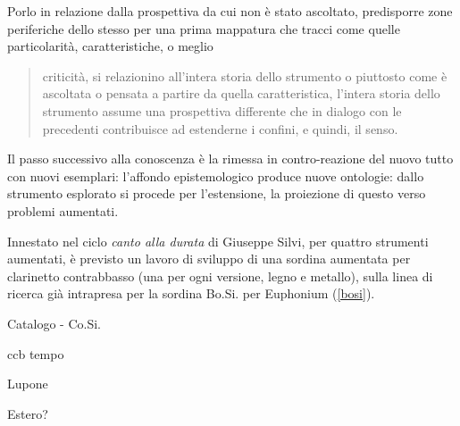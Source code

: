 \documentclass{gs-adonis}
\begin{document}
Porlo in relazione dalla prospettiva da cui non è stato ascoltato, predisporre 
zone periferiche dello stesso per una prima mappatura che tracci come 
quelle particolarità, caratteristiche, o meglio

\begin{quote}
  criticità, si relazionino all'intera storia dello strumento o piuttosto
  come è ascoltata o pensata a partire da quella caratteristica, l'intera
  storia dello strumento assume una prospettiva differente che in dialogo con
  le precedenti contribuisce ad estenderne i confini, e quindi, il senso.
\end{quote}


Il passo successivo alla conoscenza è la rimessa in contro-reazione del nuovo
tutto con nuovi esemplari: l'affondo epistemologico produce nuove ontologie:
dallo strumento esplorato si procede per l'estensione, la proiezione di questo
verso problemi aumentati.

Innestato nel ciclo \emph{canto alla durata} di Giuseppe Silvi, per quattro
strumenti aumentati, è previsto un lavoro di sviluppo di una sordina aumentata
per clarinetto contrabbasso (una per ogni versione, legno e metallo), sulla
linea di ricerca già intrapresa per la sordina Bo.Si. per Euphonium (\ref{bosi}).

\begin{description}
  \item[Catalogo - Co.Si.]
\end{description}

\begin{description}
  \item[ccb tempo]
\end{description}

\begin{description}
  \item[Lupone]
\end{description}









Estero?

\end{document}
